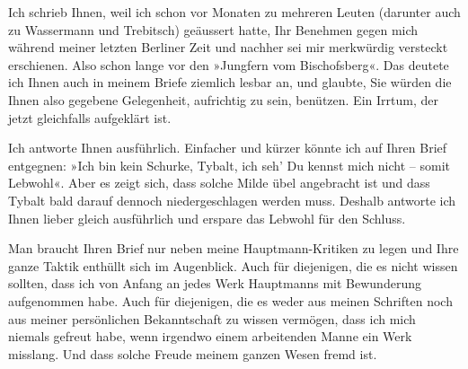 \pstart
           Ich schrieb Ihnen, weil ich schon vor Monaten zu mehreren Leuten (darunter auch zu
                  Wassermann und Trebitsch) geäussert hatte, Ihr Benehmen gegen mich während
               meiner letzten Berliner Zeit und nachher sei mir
               merkwürdig versteckt erschienen. Also schon lange vor den »Jungfern vom Bischofsberg«. Das deutete ich Ihnen auch in
               meinem Briefe ziemlich lesbar an, und glaubte, Sie würden die Ihnen also gegebene
               Gelegenheit, aufrichtig zu sein, benützen. Ein Irrtum, der jetzt gleichfalls
               aufgeklärt ist.\pend
           
\pstart
           Ich antworte Ihnen ausführlich. Einfacher und kürzer {\pb}könnte ich auf Ihren Brief
               entgegnen: »Ich bin kein Schurke,
                  Tybalt, ich seh’ Du kennst mich nicht – somit Lebwohl«. Aber es zeigt sich, dass
               solche Milde übel angebracht ist und dass Tybalt bald darauf dennoch niedergeschlagen werden muss.
               Deshalb antworte ich Ihnen lieber gleich ausführlich und erspare das Lebwohl für den
               Schluss.\pend
           
\pstart
           Man braucht Ihren Brief nur neben meine Hauptmann-Kritiken zu legen und Ihre
               ganze Taktik enthüllt sich im Augenblick. Auch für diejenigen, die es nicht wissen
               sollten, dass ich von Anfang an jedes Werk Hauptmanns mit Bewunderung aufgenommen habe. Auch für diejenigen, die es
               weder aus meinen Schriften noch aus meiner persönlichen Bekanntschaft zu wissen
               vermögen, dass ich mich niemals gefreut habe, wenn irgendwo einem arbeitenden Manne
               ein Werk misslang. Und dass solche Freude meinem ganzen Wesen fremd ist.\pend
           
